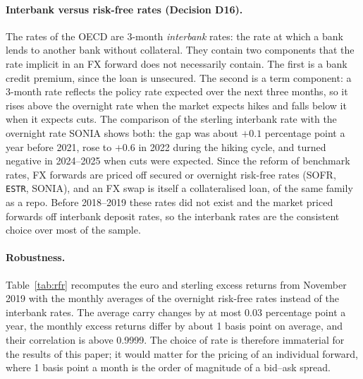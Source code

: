 \paragraph{Interbank versus risk-free rates (Decision D16).}
The rates of the OECD are 3-month \emph{interbank} rates: the rate at which a bank lends to another bank without collateral.
They contain two components that the rate implicit in an FX forward does not necessarily contain.
The first is a bank credit premium, since the loan is unsecured.
The second is a term component: a 3-month rate reflects the policy rate expected over the next three months, so it rises above the overnight rate when the market expects hikes and falls below it when it expects cuts.
The comparison of the sterling interbank rate with the overnight rate SONIA shows both: the gap was about $+0.1$ percentage point a year before 2021, rose to $+0.6$ in 2022 during the hiking cycle, and turned negative in 2024--2025 when cuts were expected.
Since the reform of benchmark rates, FX forwards are priced off secured or overnight risk-free rates (SOFR, \texttt{ESTR}, SONIA), and an FX swap is itself a collateralised loan, of the same family as a repo.
Before 2018--2019 these rates did not exist and the market priced forwards off interbank deposit rates, so the interbank rates are the consistent choice over most of the sample.

\paragraph{Robustness.}
Table~\ref{tab:rfr} recomputes the euro and sterling excess returns from November 2019 with the monthly averages of the overnight risk-free rates instead of the interbank rates.
The average carry changes by at most 0.03 percentage point a year, the monthly excess returns differ by about 1 basis point on average, and their correlation is above 0.9999.
The choice of rate is therefore immaterial for the results of this paper; it would matter for the pricing of an individual forward, where 1 basis point a month is the order of magnitude of a bid--ask spread.

\begin{table}[h]
\centering
\footnotesize

\caption{Excess returns against the US dollar with 3-month interbank rates (baseline) and with monthly averages of the overnight risk-free rates (SOFR for USD, \texttt{ESTR} for EUR, SONIA for GBP), November 2019 -- January 2026. Generated by \texttt{scripts/robustness\_rfr.py}.}
\label{tab:rfr}
\end{table}

